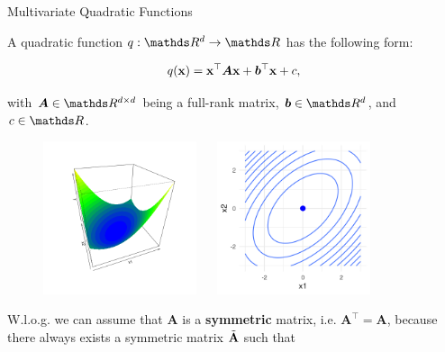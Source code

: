   \begin{vbframe}{Multivariate Quadratic Functions}
  
  A quadratic function $q: \R^d \to \R$ has the following form: 
  
  $$
    q(\mathbf{x}) = \mathbf{x}^\top \bm{A} \mathbf{x} + \bm{b}^\top \mathbf{x} + c,
  $$
  
  with $\bm{A} \in \R^{d \times d}$ being a full-rank matrix, $\bm{b} \in \R^d$, and $c \in \R$. %
  
  \begin{figure}
    \includegraphics[height=0.4\textwidth, width = 0.4\textwidth]{figure_man/quadratic_functions_2D_example_1_1.png} ~~ \includegraphics[height=0.4\textwidth, width = 0.4\textwidth]{figure_man/quadratic_functions_2D_example_1_2.png}\\
    \begin{footnotesize} 
    \end{footnotesize}
  \end{figure}
  
  \framebreak 
  
  
  W.l.o.g. we can assume that $\bm{A}$ is a \textbf{symmetric} matrix, i.e. $\bm{A}^\top = \bm{A}$, because there always exists a symmetric matrix $\tilde {\mathbf{A}}$ such that 
  
  \vspace*{-0.3cm}
  

\end{vbframe}
